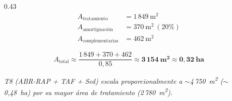 \documentclass[aspectratio=169]{beamer}
\begin{document}
\begin{frame}
\begin{columns}[T]
\begin{column}{0.43\textwidth}
\vspace{4pt}
\begin{align*}
A_{\text{tratamiento}} &= 1\,849~\text{m}^2 \\
A_{\text{amortiguaci\'{o}n}} &= 370~\text{m}^2~(20\%) \\
A_{\text{complementarias}} &= 462~\text{m}^2
\end{align*}

\vspace{4pt}
\[
A_{\text{total}} \approx \frac{1\,849 + 370 + 462}{0{,}85} \approx \mathbf{3\,154~m^2} \approx \mathbf{0{,}32~ha}
\]

\vspace{6pt}
\scriptsize
\textit{T8 (ABR-RAP + TAF + Sed) escala proporcionalmente a $\sim$4\,750~m\textsuperscript{2} ($\sim$0{,}48~ha) por su mayor \'{a}rea de tratamiento (2\,780~m\textsuperscript{2}).}
\end{column}
\end{columns}
\end{frame}
\end{document}
